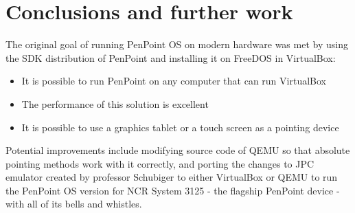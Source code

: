 \clearpage %

\section{Conclusions and further work}

The original goal of running PenPoint OS on modern hardware was met by using
the SDK distribution of PenPoint and installing it on FreeDOS in VirtualBox:

\begin{itemize}
    \item
        It is possible to run PenPoint on any computer that can run VirtualBox
    \item
        The performance of this solution is excellent
    \item
        It is possible to use a graphics tablet or a touch screen as a pointing
        device
\end{itemize}

Potential improvements include modifying source code of QEMU so that absolute
pointing methods work with it correctly, and porting the changes to JPC
emulator created by professor Schubiger to either VirtualBox or QEMU to run the
PenPoint OS version for NCR System 3125 - the flagship PenPoint device - with
all of its bells and whistles.

